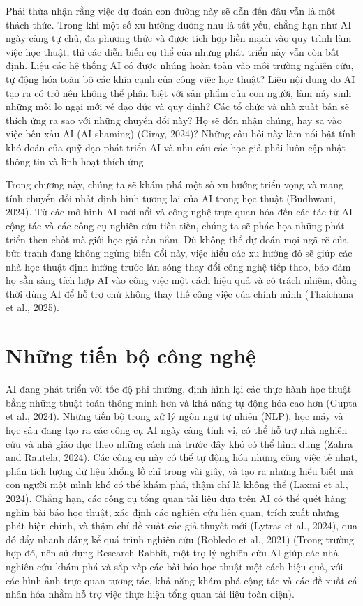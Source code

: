 Phải thừa nhận rằng việc dự đoán con đường này sẽ dẫn đến đâu vẫn là một thách thức. Trong khi một số xu hướng dường như là tất yếu, chẳng hạn như AI ngày càng tự chủ, đa phương thức và được tích hợp liền mạch vào quy trình làm việc học thuật, thì các diễn biến cụ thể của những phát triển này vẫn còn bất định. Liệu các hệ thống AI có được nhúng hoàn toàn vào môi trường nghiên cứu, tự động hóa toàn bộ các khía cạnh của công việc học thuật? Liệu nội dung do AI tạo ra có trở nên không thể phân biệt với sản phẩm của con người, làm nảy sinh những mối lo ngại mới về đạo đức và quy định? Các tổ chức và nhà xuất bản sẽ thích ứng ra sao với những chuyển đổi này? Họ sẽ đón nhận chúng, hay sa vào việc bêu xấu AI (AI shaming) (Giray, 2024)? Những câu hỏi này làm nổi bật tính khó đoán của quỹ đạo phát triển AI và nhu cầu các học giả phải luôn cập nhật thông tin và linh hoạt thích ứng.

Trong chương này, chúng ta sẽ khám phá một số xu hướng triển vọng và mang tính chuyển đổi nhất định hình tương lai của AI trong học thuật (Budhwani, 2024). Từ các mô hình AI mới nổi và công nghệ trực quan hóa đến các tác tử AI cộng tác và các công cụ nghiên cứu tiên tiến, chúng ta sẽ phác họa những phát triển then chốt mà giới học giả cần nắm. Dù không thể dự đoán mọi ngã rẽ của bức tranh đang không ngừng biến đổi này, việc hiểu các xu hướng đó sẽ giúp các nhà học thuật định hướng trước làn sóng thay đổi công nghệ tiếp theo, bảo đảm họ sẵn sàng tích hợp AI vào công việc một cách hiệu quả và có trách nhiệm, đồng thời dùng AI để hỗ trợ chứ không thay thế công việc của chính mình (Thaichana et al., 2025).

\section{Những tiến bộ công nghệ}

AI đang phát triển với tốc độ phi thường, định hình lại các thực hành học thuật bằng những thuật toán thông minh hơn và khả năng tự động hóa cao hơn (Gupta et al., 2024). Những tiến bộ trong xử lý ngôn ngữ tự nhiên (NLP), học máy và học sâu đang tạo ra các công cụ AI ngày càng tinh vi, có thể hỗ trợ nhà nghiên cứu và nhà giáo dục theo những cách mà trước đây khó có thể hình dung (Zahra and Rautela, 2024). Các công cụ này có thể tự động hóa những công việc tẻ nhạt, phân tích lượng dữ liệu khổng lồ chỉ trong vài giây, và tạo ra những hiểu biết mà con người một mình khó có thể khám phá, thậm chí là không thể (Laxmi et al., 2024). Chẳng hạn, các công cụ tổng quan tài liệu dựa trên AI có thể quét hàng nghìn bài báo học thuật, xác định các nghiên cứu liên quan, trích xuất những phát hiện chính, và thậm chí đề xuất các giả thuyết mới (Lytras et al., 2024), qua đó đẩy nhanh đáng kể quá trình nghiên cứu (Robledo et al., 2021) (Trong trường hợp đó, nên sử dụng Research Rabbit, một trợ lý nghiên cứu AI giúp các nhà nghiên cứu khám phá và sắp xếp các bài báo học thuật một cách hiệu quả, với các hình ảnh trực quan tương tác, khả năng khám phá cộng tác và các đề xuất cá nhân hóa nhằm hỗ trợ việc thực hiện tổng quan tài liệu toàn diện).

